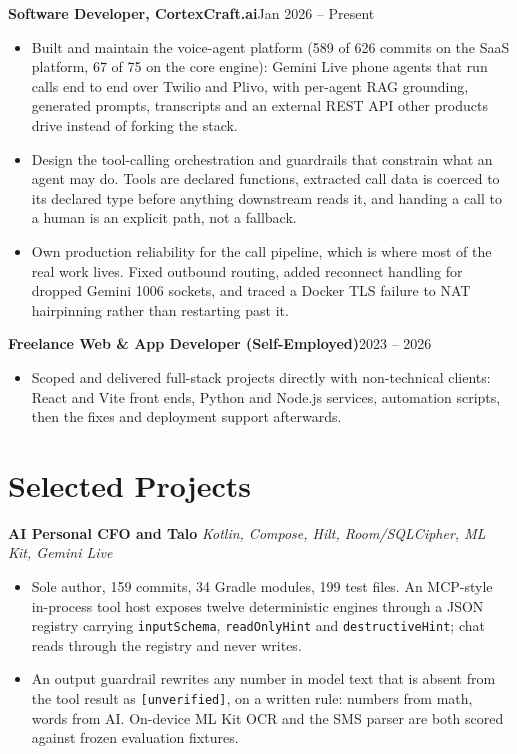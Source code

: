 \documentclass[10pt,a4paper]{article}
\newcommand{\entry}[2]{\textbf{#1}\hfill{#2}\par}
\begin{document}
\entry{Software Developer, CortexCraft.ai}{Jan 2026 -- Present}
\begin{itemize}
  \item Built and maintain the voice-agent platform (589 of 626 commits on the SaaS platform, 67 of 75
        on the core engine): Gemini Live phone agents that run calls end to end over Twilio and Plivo,
        with per-agent RAG grounding, generated prompts, transcripts and an external REST API other
        products drive instead of forking the stack.
  \item Design the tool-calling orchestration and guardrails that constrain what an agent may do.
        Tools are declared functions, extracted call data is coerced to its declared type before anything
        downstream reads it, and handing a call to a human is an explicit path, not a fallback.
  \item Own production reliability for the call pipeline, which is where most of the real work lives.
        Fixed outbound routing, added reconnect handling for dropped Gemini 1006 sockets, and traced a
        Docker TLS failure to NAT hairpinning rather than restarting past it.
\end{itemize}

\vspace{1pt}
\entry{Freelance Web \& App Developer (Self-Employed)}{2023 -- 2026}
\begin{itemize}
  \item Scoped and delivered full-stack projects directly with non-technical clients: React and Vite
        front ends, Python and Node.js services, automation scripts, then the fixes and deployment
        support afterwards.
\end{itemize}

\section{Selected Projects}

\textbf{AI Personal CFO and Talo} \textit{Kotlin, Compose, Hilt, Room/SQLCipher, ML Kit, Gemini Live}
\begin{itemize}
  \item Sole author, 159 commits, 34 Gradle modules, 199 test files. An MCP-style in-process tool host
        exposes twelve deterministic engines through a JSON registry carrying \texttt{inputSchema},
        \texttt{readOnlyHint} and \texttt{destructiveHint}; chat reads through the registry and never
        writes.
  \item An output guardrail rewrites any number in model text that is absent from the tool result as
        \texttt{[unverified]}, on a written rule: numbers from math, words from AI. On-device ML Kit OCR
        and the SMS parser are both scored against frozen evaluation fixtures.
\end{itemize}
\end{document}
